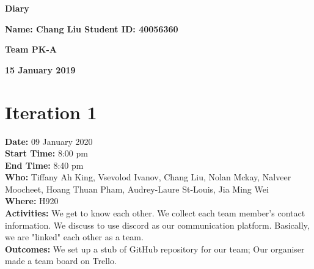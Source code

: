 \documentclass[12pt]{article}
\begin{document}
\vspace*{0.2in}
\centerline{\bf\Large Diary}

\vspace*{0.2in}
\centerline{\bf\Large Name: Chang Liu Student ID: 40056360}

\vspace*{0.2in}
\centerline{\bf\Large Team PK-A}

\vspace*{0.2in}
\centerline{\bf\Large 15 January 2019}

\section{Iteration 1}

{\bf Date:} 09 January 2020\\
{\bf Start Time:} 8:00 pm\\
{\bf End Time:}  8:40 pm\\
{\bf Who:} Tiffany Ah King, Vsevolod Ivanov, Chang Liu, Nolan Mckay, Nalveer Moocheet, Hoang Thuan Pham, Audrey-Laure St-Louis, Jia Ming Wei\\
{\bf Where:} H920 \\
{\bf Activities:} We get to know each other. We collect each team member's contact information. We discuss to use discord as our communication platform. Basically, we are "linked" each other as a team.\\
{\bf Outcomes:}  We set up a stub of GitHub repository for our team; Our organiser made a team board on Trello. \\\\
\end{document}
